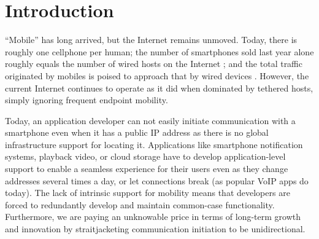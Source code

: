 \vsp
\section{Introduction}
\label{sec:intro}
``Mobile'' has long arrived, but the Internet remains unmoved. Today, there is roughly one cellphone per human; the number of smartphones sold last year alone roughly equals the number of wired hosts on the Internet \cite{gartner}; and the total traffic originated by mobiles is poised to approach that by wired devices \cite{cisco-vni}. However, the current Internet continues to operate as it did when dominated by tethered hosts, simply ignoring frequent endpoint mobility.

Today, an application developer can not easily initiate communication with a smartphone even when it has a public IP address as there is no global infrastructure support for locating it. Applications like smartphone notification systems, playback video, or cloud storage have to develop application-level support to enable a seamless experience for their users even as they change addresses several times a day, or let connections break (as popular VoIP apps do today).   The lack of intrinsic support for mobility means that developers are forced to redundantly develop and maintain common-case functionality. Furthermore, we are paying an unknowable price in terms of long-term growth and innovation by straitjacketing communication initiation to be unidirectional.



